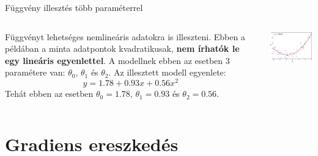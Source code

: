 \documentclass[english, aspectratio=169]{beamer}
\makeatletter
\let\origtableofcontents=\tableofcontents
\def\tableofcontents{\@ifnextchar[{\origtableofcontents}{\gobbletableofcontents}}
\def\gobbletableofcontents#1{\origtableofcontents}
\makeatother
\begin{document}
\begin{frame}{Függvény illesztés több paraméterrel}
	\begin{columns}
		\begin{column}{.5\textwidth}
			Függvényt lehetséges nemlineáris adatokra is illeszteni. Ebben a példában a minta adatpontok kvadratikusak, \textbf{nem írhatók le egy lineáris egyenlettel}. A modellnek ebben az esetben $3$ paramétere van: $\theta_0$, $\theta_1$ és $\theta_2$. Az illesztett modell egyenlete: 
			\[
			y=1.78 + 0.93x + 0.56 x^2
			\]
			Tehát ebben az esetben $\theta_0=1.78$, $\theta_1=0.93$ és $\theta_2=0.56$.
		\end{column}
		\begin{column}{.5\textwidth}
			\begin{center}
				\includegraphics[width=7cm, keepaspectratio]{images/ql_10.png}
			\end{center}
		\end{column}
	\end{columns}
\end{frame}

\section{Gradiens ereszkedés}

\begin{frame}
	\tableofcontents[currentsection]
\end{frame}
\end{document}
